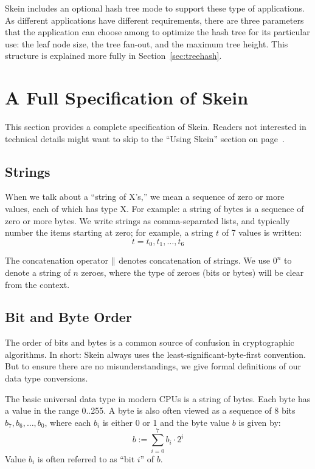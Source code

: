 \documentclass[11pt,twoside]{article}
\newcommand{\concat}{\mathbin{|\hspace{-1pt}|}}
\begin{document}
Skein includes an optional hash tree mode to support these type of applications.  As different applications have different requirements, there are three parameters that the application can choose among to optimize the hash tree for its particular use: the leaf node size, the tree fan-out, and the maximum tree height.  This structure is explained more fully in Section~\ref{sec:treehash}.

\section{A Full Specification of Skein}\label{sec:full}

This section provides a complete specification of Skein. Readers not interested in technical details might want to skip to the ``Using Skein'' section on page~\pageref{sec:using}.

\subsection{Strings}

When we talk about a ``string of X's,'' we mean a sequence of zero or more values, each of which has type X. For example: a string of bytes is a sequence of zero or more bytes. We write strings as comma-separated lists, and typically number the items starting at zero; for example, a string $t$ of 7 values is written:
\[
t = t_0, t_1, \ldots, t_6
\]

The concatenation operator $\concat$ denotes concatenation of strings. We use $0^n$ to denote a string of $n$ zeroes, where the type of zeroes (bits or bytes) will be clear from the context.

\subsection{Bit and Byte Order}

The order of bits and bytes is a common source of confusion in cryptographic algorithms. In short: Skein always uses the least-significant-byte-first convention. But to ensure there are no misunderstandings, we give formal definitions of our data type conversions.

The basic universal data type in modern CPUs is a string of bytes. Each byte has a value in the range 0..255. A byte is also often viewed as a sequence of 8 bits $b_7, b_6, \ldots, b_0$, where each $b_i$ is either 0 or 1 and the byte value $b$ is given by:
\[
b := \sum_{i=0}^7 b_i \cdot 2^i
\]
Value $b_i$ is often referred to as ``bit $i$'' of $b$.
\end{document}
